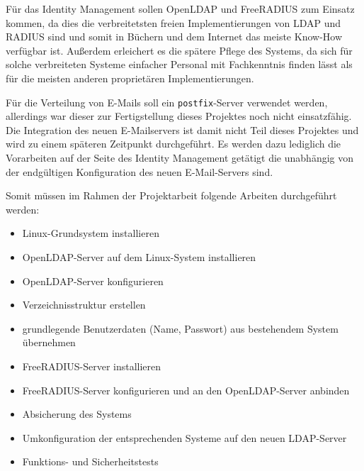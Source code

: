 \documentclass[11pt,a4paper,titlepage=firstiscover,headsepline,bibtotoc]{scrartcl} %
\begin{document}
Für das Identity Management sollen OpenLDAP und FreeRADIUS zum Einsatz kommen, da dies die verbreitetsten freien Implementierungen von LDAP und RADIUS sind und somit in Büchern und dem Internet das meiste Know-How verfügbar ist. Außerdem erleichert es die spätere Pflege des Systems, da sich für solche verbreiteten Systeme einfacher Personal mit Fachkenntnis finden lässt als für die meisten anderen proprietären Implementierungen.

Für die Verteilung von E-Mails soll ein \texttt{postfix}-Server verwendet werden, allerdings war dieser zur Fertigstellung dieses Projektes noch nicht einsatzfähig. Die Integration des neuen E-Mailservers ist damit nicht Teil dieses Projektes und wird zu einem späteren Zeitpunkt durchgeführt. Es werden dazu lediglich die Vorarbeiten auf der Seite des Identity Management getätigt die unabhängig von der endgültigen Konfiguration des neuen E-Mail-Servers sind.

\medskip \noindent 		%
Somit müssen im Rahmen der Projektarbeit folgende Arbeiten durchgeführt werden: 
\begin{itemize}
\item Linux-Grundsystem installieren
\item OpenLDAP-Server auf dem Linux-System installieren
\item OpenLDAP-Server konfigurieren
\item Verzeichnisstruktur erstellen
\item grundlegende Benutzerdaten (Name, Passwort) aus bestehendem System übernehmen
\item FreeRADIUS-Server installieren
\item FreeRADIUS-Server konfigurieren und an den OpenLDAP-Server anbinden
\item Absicherung des Systems
\item Umkonfiguration der entsprechenden Systeme auf den neuen LDAP-Server
\item Funktions- und Sicherheitstests
\end{itemize}
\end{document}
